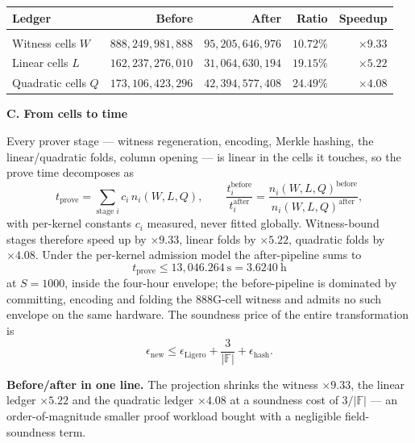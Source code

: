 \documentclass[10pt,a4paper]{article}
\begin{document}
\begin{center}
\sffamily\small
\begin{tabular}{lrrrr}
\textbf{\color{navy}Ledger} & \textbf{\color{navy}Before} & \textbf{\color{navy}After} & \textbf{\color{navy}Ratio} & \textbf{\color{navy}Speedup}\\[1pt]
\hline\\[-8pt]
Witness cells $W$    & $888{,}249{,}981{,}888$ & $95{,}205{,}646{,}976$ & $10.72\%$ & $\times9.33$\\
Linear cells $L$     & $162{,}237{,}276{,}010$ & $31{,}064{,}630{,}194$ & $19.15\%$ & $\times5.22$\\
Quadratic cells $Q$  & $173{,}106{,}423{,}296$ & $42{,}394{,}577{,}408$ & $24.49\%$ & $\times4.08$\\
\end{tabular}
\end{center}

{\sffamily\bfseries\color{navy}C. From cells to time}

Every prover stage — witness regeneration, encoding, Merkle hashing, the linear/quadratic folds,
column opening — is linear in the cells it touches, so the prove time decomposes as
\[
t_{\mathrm{prove}}
=\sum_{\text{stage }i} c_i\,n_i(W,L,Q),
\qquad
\frac{t^{\mathrm{before}}_i}{t^{\mathrm{after}}_i}
=\frac{n_i(W,L,Q)^{\mathrm{before}}}{n_i(W,L,Q)^{\mathrm{after}}},
\]
with per-kernel constants $c_i$ measured, never fitted globally. Witness-bound stages therefore
speed up by $\times9.33$, linear folds by $\times5.22$, quadratic folds by $\times4.08$. Under the
per-kernel admission model the after-pipeline sums to
\[
t_{\mathrm{prove}}\le 13{,}046.264\ \mathrm{s}=3.6240\ \mathrm{h}
\]
at $S=1000$, inside the four-hour envelope; the before-pipeline is dominated by committing,
encoding and folding the $888$G-cell witness and admits no such envelope on the same hardware.
The soundness price of the entire transformation is
\[
\epsilon_{\mathrm{new}}\le\epsilon_{\mathrm{Ligero}}+\frac{3}{|\mathbb F|}+\epsilon_{\mathrm{hash}} .
\]

\begin{resultbox}
\textbf{\color{green}Before/after in one line.} The projection shrinks the witness $\times9.33$,
the linear ledger $\times5.22$ and the quadratic ledger $\times4.08$ at a soundness cost of
$3/|\mathbb F|$ — an order-of-magnitude smaller proof workload bought with a negligible
field-soundness term.
\end{resultbox}
\end{document}
